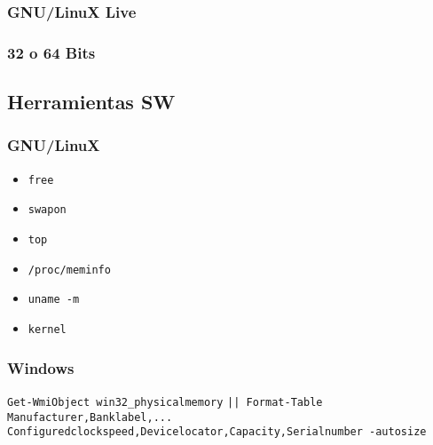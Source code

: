 \documentclass[11pt]{article}
\begin{document}
\subsubsection{GNU/LinuX Live}
\label{sec:org3e9463b}
\subsubsection{32 o 64 Bits}
\label{sec:orgb916761}

\subsection{Herramientas SW}
\label{sec:orgced648e}

\subsubsection{GNU/LinuX}
\label{sec:org72d2952}

\begin{itemize}
\item \texttt{free}
\item \texttt{swapon}
\item \texttt{top}
\item \texttt{/proc/meminfo}
\item \texttt{uname -m}
\item \texttt{kernel}
\end{itemize}

\subsubsection{Windows}
\label{sec:org91207af}

\texttt{Get-WmiObject win32\_physicalmemory}
\texttt{|| Format-Table Manufacturer,Banklabel,...}
\texttt{Configuredclockspeed,Devicelocator,Capacity,Serialnumber -autosize}
\end{document}
